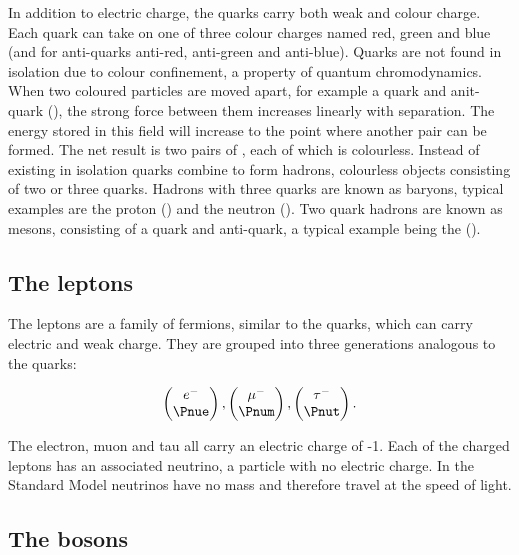 In addition to electric charge, the quarks carry both weak and colour charge. Each quark can take on one of three colour charges named red, green and blue (and for anti-quarks anti-red, anti-green and anti-blue). Quarks are not found in isolation due to colour confinement, a property of quantum chromodynamics. When two coloured particles are moved apart, for example a quark and anit-quark (\Pq \Paq), the strong force between them increases linearly with separation. The energy stored in this field will increase to the point where another \Pq \Paq pair can be formed. The net result is two pairs of \Pq \Paq, each of which is colourless. Instead of existing in isolation quarks combine to form hadrons, colourless objects consisting of two or three quarks. Hadrons with three quarks are known as baryons, typical examples are the proton (\Pup\Pup\Pdown) and the neutron (\Pup\Pdown\Pdown). Two quark hadrons are known as mesons, consisting of a quark and anti-quark, a typical example being the  \Ppiplus (\Pup\APdown).

\subsection{The leptons}
\label{section:particle-physics:SM:leptons}

The leptons are a family of fermions, similar to the quarks, which can carry electric and weak charge. They are grouped into three generations analogous to the quarks:


\begin{equation}
  \begin{pmatrix}
    e^{-} \\
    \Pnue
  \end{pmatrix}
  ,
  \begin{pmatrix}
    \mu^{-} \\
    \Pnum
  \end{pmatrix}
  ,
  \begin{pmatrix}
    \tau^{-} \\
    \Pnut
  \end{pmatrix}
.
\end{equation}

\noindent
The electron, muon and tau all carry an electric charge of -1. Each of the charged leptons has an associated neutrino, a particle with no electric charge. In the Standard Model neutrinos have no mass and therefore travel at the speed of light.


\subsection{The bosons}
\label{section:particle-physics:SM:bosons}

